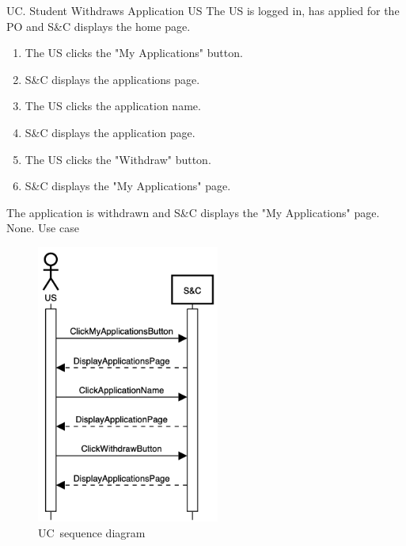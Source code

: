 
\clearpage
\begin{usecase}
    {UC\theuc. Student Withdraws Application}
    {US}
    {The US is logged in, has applied for the PO and S\&C displays the home page.}
    {\begin{enumerate}[leftmargin=*]
        \item The US clicks the "My Applications" button.
        \item S\&C displays the applications page.
        \item The US clicks the application name.
        \item S\&C displays the application page.
        \item The US clicks the "Withdraw" button.
        \item S\&C displays the "My Applications" page.
    \end{enumerate}}
    {The application is withdrawn and S\&C displays the "My Applications" page.}
    {None.}
    {Use case \theuc}
\end{usecase}

\begin{figure}[h]
    \centering
    \includegraphics[width=6cm]{images/sequence-diagrams/student-withdraws-application.png}
    \caption{UC\theuc\ sequence diagram}
\end{figure}


